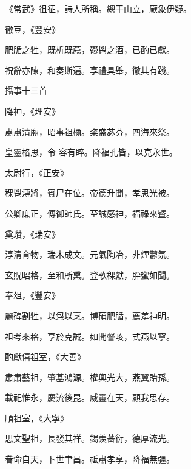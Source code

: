 \begin{pinyinscope}
 《常武》徂征，詩人所稱。總干山立，厥象伊疑。



 徹豆，《豐安》



 肥腯之牲，既析既薦，鬱鬯之酒，已酌已獻。



 祝辭亦陳，和奏斯遍。享禮具舉，徹其有踐。



 攝事十三首



 降神，《理安》



 肅肅清廟，昭事祖檷。粢盛苾芬，四海來祭。



 皇靈格思，令
 容有睟。降福孔皆，以克永世。



 太尉行，《正安》



 稞鬯溥將，賓尸在位。帝德升聞，孝思光被。



 公卿庶正，傅御師氏。至誠感神，福祿來暨。



 奠瓚，《瑞安》



 淳清育物，瑞木成文。元氣陶冶，非煙鬱氛。



 玄貺昭格，至和所熏。登歌稞獻，肸蠁如聞。



 奉俎，《豐安》



 麗碑割牲，以炰以烹。博碩肥腯，薦羞神明。



 祖考來格，享於克誠。如聞謦咳，式燕以寧。



 酌獻僖祖室，《大善》



 肅肅藝祖，肇基鴻源。權輿光大，燕翼貽孫。



 載祀惟永，慶流後昆。威靈在天，顧我思存。



 順祖室，《大寧》



 思文聖祖，長發其祥。錫羨蕃衍，德厚流光。



 眷命自天，卜世聿昌。祗肅孝享，降福無疆。




\end{pinyinscope}
